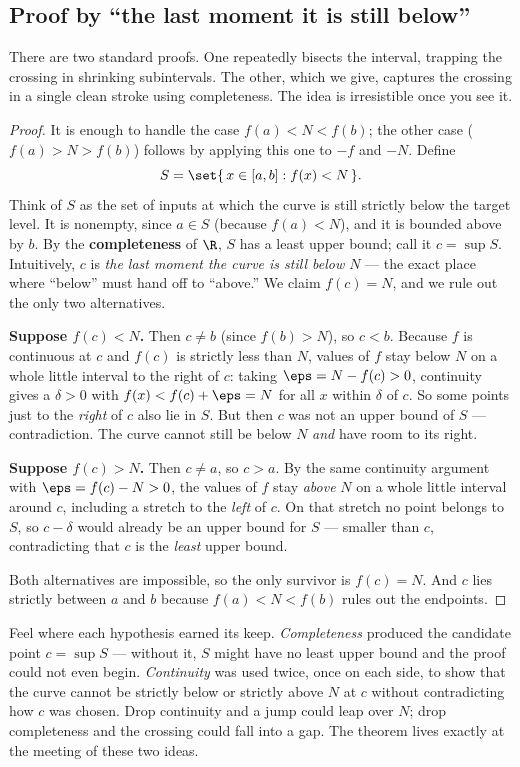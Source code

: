 \subsection{Proof by ``the last moment it is still below''}

There are two standard proofs. One repeatedly bisects the interval, trapping the crossing
in shrinking subintervals. The other, which we give, captures the crossing in a single
clean stroke using completeness. The idea is irresistible once you see it.

\begin{proof}
It is enough to handle the case $f(a)<N<f(b)$; the other case ($f(a)>N>f(b)$) follows by
applying this one to $-f$ and $-N$. Define
\[
  S=\set{\,x\in[a,b] : f(x)<N\,}.
\]
Think of $S$ as the set of inputs at which the curve is still strictly below the target
level. It is nonempty, since $a\in S$ (because $f(a)<N$), and it is bounded above by $b$.
By the \textbf{completeness} of $\R$, $S$ has a least upper bound; call it $c=\sup S$.
Intuitively, $c$ is \emph{the last moment the curve is still below $N$} --- the exact place
where ``below'' must hand off to ``above.'' We claim $f(c)=N$, and we rule out the only two
alternatives.

\textbf{Suppose $f(c)<N$.} Then $c\ne b$ (since $f(b)>N$), so $c<b$. Because $f$ is
continuous at $c$ and $f(c)$ is strictly less than $N$, values of $f$ stay below $N$ on a
whole little interval to the right of $c$: taking $\eps=N-f(c)>0$, continuity gives a
$\delta>0$ with $f(x)<f(c)+\eps=N$ for all $x$ within $\delta$ of $c$. So some points just
to the \emph{right} of $c$ also lie in $S$. But then $c$ was not an upper bound of $S$ ---
contradiction. The curve cannot still be below $N$ \emph{and} have room to its right.

\textbf{Suppose $f(c)>N$.} Then $c\ne a$, so $c>a$. By the same continuity argument with
$\eps=f(c)-N>0$, the values of $f$ stay \emph{above} $N$ on a whole little interval around
$c$, including a stretch to the \emph{left} of $c$. On that stretch no point belongs to
$S$, so $c-\delta$ would already be an upper bound for $S$ --- smaller than $c$,
contradicting that $c$ is the \emph{least} upper bound.

Both alternatives are impossible, so the only survivor is $f(c)=N$. And $c$ lies strictly
between $a$ and $b$ because $f(a)<N<f(b)$ rules out the endpoints.
\end{proof}

\begin{focusbox}
Feel where each hypothesis earned its keep. \emph{Completeness} produced the candidate
point $c=\sup S$ --- without it, $S$ might have no least upper bound and the proof could not
even begin. \emph{Continuity} was used twice, once on each side, to show that the curve
cannot be strictly below or strictly above $N$ at $c$ without contradicting how $c$ was
chosen. Drop continuity and a jump could leap over $N$; drop completeness and the crossing
could fall into a gap. The theorem lives exactly at the meeting of these two ideas.
\end{focusbox}

